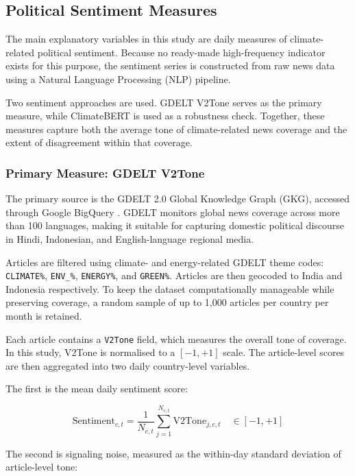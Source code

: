 \documentclass[12pt,a4paper]{article}
\begin{document}
\subsection{Political Sentiment Measures}

The main explanatory variables in this study are daily measures of climate-related political sentiment. Because no ready-made high-frequency indicator exists for this purpose, the sentiment series is constructed from raw news data using a Natural Language Processing (NLP) pipeline.

Two sentiment approaches are used. GDELT V2Tone serves as the primary measure, while ClimateBERT is used as a robustness check. Together, these measures capture both the average tone of climate-related news coverage and the extent of disagreement within that coverage.

\subsubsection{Primary Measure: GDELT V2Tone}

The primary source is the GDELT 2.0 Global Knowledge Graph (GKG), accessed through Google BigQuery \citep{Leetaru2013}. GDELT monitors global news coverage across more than 100 languages, making it suitable for capturing domestic political discourse in Hindi, Indonesian, and English-language regional media.

Articles are filtered using climate- and energy-related GDELT theme codes: \texttt{CLIMATE\%}, \texttt{ENV\_\%}, \texttt{ENERGY\%}, and \texttt{GREEN\%}. Articles are then geocoded to India and Indonesia respectively. To keep the dataset computationally manageable while preserving coverage, a random sample of up to 1,000 articles per country per month is retained.

Each article contains a \texttt{V2Tone} field, which measures the overall tone of coverage. In this study, V2Tone is normalised to a $[-1,+1]$ scale. The article-level scores are then aggregated into two daily country-level variables.

The first is the mean daily sentiment score:

\begin{equation}
\text{Sentiment}_{c,t} = \frac{1}{N_{c,t}} \sum_{j=1}^{N_{c,t}} \text{V2Tone}_{j,c,t}
\quad \in [-1, +1]
\label{eq:sentiment}
\end{equation}

The second is signaling noise, measured as the within-day standard deviation of article-level tone:
\end{document}
